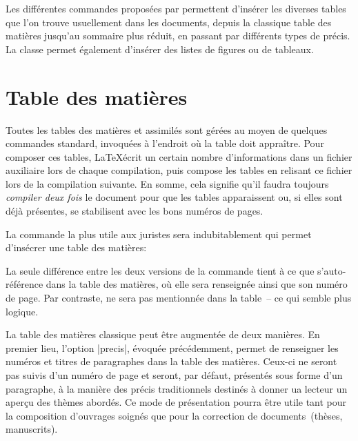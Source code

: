 Les différentes commandes proposées par \frenchlaw permettent d'insérer les diverses tables que l'on trouve usuellement dans les documents, depuis la classique table des matières jusqu'au sommaire plus réduit, en passant par différents types de précis. La classe permet également d'insérer des listes de figures ou de tableaux.

\section{Table des matières}

Toutes les tables des matières et assimilés sont gérées au moyen de quelques commandes standard, invoquées à l'endroit où la table doit appraître. Pour composer ces tables, \LaTeX écrit un certain nombre d'informations dans un fichier auxiliaire lors de chaque compilation, puis compose les tables en relisant ce fichier lors de la compilation suivante. En somme, cela signifie qu'il faudra toujours \emph{compiler deux fois} le document pour que les tables apparaissent ou, si elles sont déjà présentes, se stabilisent avec les bons numéros de pages.

La commande la plus utile aux juristes sera indubitablement  qui permet d'insécrer une table des matières:

\begin{macro}
	\tableofcontents %
	\tableofcontents* %
\end{macro}

La seule différence entre les deux versions de la commande tient à ce que  s'auto-référence dans la table des matières, où elle sera renseignée ainsi que son numéro de page. Par contraste,  ne sera pas mentionnée dans la table~-- ce qui semble plus logique.

La table des matières classique peut être augmentée de deux manières. En premier lieu, l'option |precis|, évoquée précédemment, permet de renseigner les numéros et titres de paragraphes dans la table des matières. Ceux-ci ne seront pas suivis d'un numéro de page et seront, par défaut, présentés sous forme d'un paragraphe, à la manière des précis traditionnels destinés à donner ua lecteur un aperçu des thèmes abordés. Ce mode de présentation pourra être utile tant pour la composition d'ouvrages soignés que pour la correction de documents~(thèses, manuscrits).

